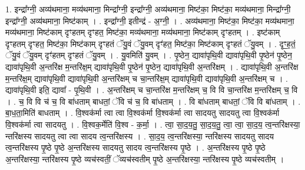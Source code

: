 \documentclass[17pt]{extarticle}
\begin{document}
1. इन्द्रा᳚ग्नी॒ अव्य॑थमाना॒ मव्य॑थमाना॒ मिन्द्रा᳚ग्नी॒ इन्द्रा᳚ग्नी॒ अव्य॑थमाना॒ मिष्ट॑का॒ मिष्ट॑का॒ मव्य॑थमाना॒ मिन्द्रा᳚ग्नी॒ इन्द्रा᳚ग्नी॒ अव्य॑थमाना॒ मिष्ट॑काम् । . इन्द्रा᳚ग्नी॒ इतीन्द्र॑ - अ॒ग्नी॒ । . अव्य॑थमाना॒ मिष्ट॑का॒ मिष्ट॑का॒ मव्य॑थमाना॒ मव्य॑थमाना॒ मिष्ट॑काम् दृꣳहतम् दृꣳहत॒ मिष्ट॑का॒ मव्य॑थमाना॒ मव्य॑थमाना॒ मिष्ट॑काम् दृꣳहतम् । . इष्ट॑काम् दृꣳहतम् दृꣳहत॒ मिष्ट॑का॒ मिष्ट॑काम् दृꣳहतं ॅयु॒वं ॅयु॒वम् दृꣳ॑हत॒ मिष्ट॑का॒ मिष्ट॑काम् दृꣳहतं ॅयु॒वम् । . दृꣳ॒॒ह॒तं॒ ॅयु॒वं ॅयु॒वम् दृꣳ॑हतम् दृꣳहतं ॅयु॒वम् । . यु॒वमिति॑ यु॒वम् । . पृ॒ष्ठेन॒ द्यावा॑पृथि॒वी द्यावा॑पृथि॒वी पृ॒ष्ठेन॑ पृ॒ष्ठेन॒ द्यावा॑पृथि॒वी अ॒न्तरि॑क्ष म॒न्तरि॑क्ष॒म् द्यावा॑पृथि॒वी पृ॒ष्ठेन॑ पृ॒ष्ठेन॒ द्यावा॑पृथि॒वी अ॒न्तरि॑क्षम् । . द्यावा॑पृथि॒वी अ॒न्तरि॑क्ष म॒न्तरि॑क्ष॒म् द्यावा॑पृथि॒वी द्यावा॑पृथि॒वी अ॒न्तरि॑क्षम् च चा॒न्तरि॑क्ष॒म् द्यावा॑पृथि॒वी द्यावा॑पृथि॒वी अ॒न्तरि॑क्षम् च । . द्यावा॑पृथि॒वी इति॒ द्यावा᳚ - पृ॒थि॒वी । . अ॒न्तरि॑क्षम् च चा॒न्तरि॑क्ष म॒न्तरि॑क्षम् च॒ वि वि चा॒न्तरि॑क्ष म॒न्तरि॑क्षम् च॒ वि । . च॒ वि वि च॑ च॒ वि बा॑धताम् बाधतां॒ ॅवि च॑ च॒ वि बा॑धताम् । . वि बा॑धताम् बाधतां॒ ॅवि वि बा॑धताम् । . बा॒ध॒ता॒मिति॑ बाधताम् । . वि॒श्वक॑र्मा त्वा त्वा वि॒श्वक॑र्मा वि॒श्वक॑र्मा त्वा सादयतु सादयतु त्वा वि॒श्वक॑र्मा वि॒श्वक॑र्मा त्वा सादयतु । . वि॒श्वक॒र्मेति॑ वि॒श्व - क॒र्मा॒ । . त्वा॒ सा॒द॒य॒तु॒ सा॒द॒य॒तु॒ त्वा॒ त्वा॒ सा॒द॒य॒ त्व॒न्तरि॑क्षस्या॒ न्तरि॑क्षस्य सादयतु त्वा त्वा सादय त्व॒न्तरि॑क्षस्य । . सा॒द॒य॒ त्व॒न्तरि॑क्षस्या॒ न्तरि॑क्षस्य सादयतु सादय त्व॒न्तरि॑क्षस्य पृ॒ष्ठे पृ॒ष्ठे अ॒न्तरि॑क्षस्य सादयतु सादय त्व॒न्तरि॑क्षस्य पृ॒ष्ठे । . अ॒न्तरि॑क्षस्य पृ॒ष्ठे पृ॒ष्ठे अ॒न्तरि॑क्षस्या॒ न्तरि॑क्षस्य पृ॒ष्ठे व्यच॑स्वतीं॒ ॅव्यच॑स्वतीम् पृ॒ष्ठे अ॒न्तरि॑क्षस्या॒ न्तरि॑क्षस्य पृ॒ष्ठे व्यच॑स्वतीम् । \newline
\end{document}
